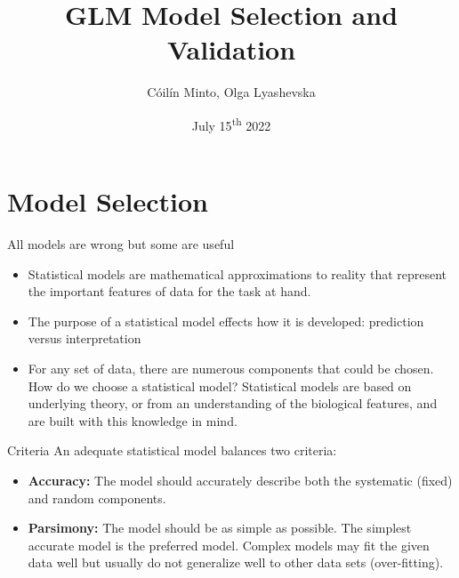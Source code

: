 \documentclass{beamer}
\title{GLM Model Selection and Validation}
\author{Cóilín Minto, Olga Lyashevska}
\date{July 15\textsuperscript{th} 2022}
\institute{Marine and Freshwater Research Centre\\ Atlantic Technological University \\ Galway, Ireland}
\begin{document}
\begin{frame}
 \maketitle
\end{frame}

\section{Model Selection}


\begin{frame}{All models are wrong but some are useful}{}

\begin{itemize}
\item Statistical models are mathematical approximations to reality that represent the important features of data for the
task at hand.
\pause
\item The purpose of a statistical model effects how it is developed: prediction versus interpretation
\pause
\item For any set of data, there are numerous components that could be chosen. How
do we choose a statistical model? Statistical models are based on underlying theory, or from an
understanding of the biological features, and are built with
this knowledge in mind. 
\end{itemize}

\end{frame}

\begin{frame}{Criteria}{}
An adequate statistical model balances two criteria:
\begin{itemize}
\item \textbf{Accuracy:} The model should accurately describe both the systematic (fixed) and random components.
\item \textbf{Parsimony:} The model should be as simple as possible. The simplest accurate model is the preferred model. Complex models may fit the given data well but usually do not generalize well to other data sets (over-fitting).
\end{itemize}
\end{frame}
\end{document}
